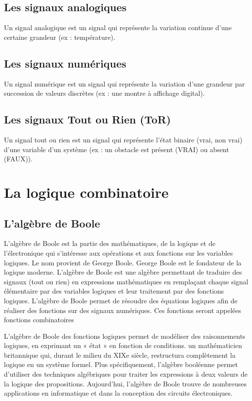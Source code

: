 \documentclass[10pt,fleqn]{article} %
\begin{document}
\subsection{Les signaux analogiques}
\begin{definition}
  Un signal analogique est un signal qui représente la variation continue d’une certaine grandeur (ex : température).
\end{definition}


\subsection{Les signaux numériques}
\begin{definition}
  Un signal numérique est un signal qui
représente la variation d’une grandeur par
succession de valeurs discrètes (ex : une
montre à affichage digital).
\end{definition}


\subsection{Les signaux Tout ou Rien (ToR)}
\begin{definition}
  Un signal tout ou rien est un signal qui représente l’état binaire (vrai, non
vrai) d’une variable d’un système (ex : un obstacle est présent (VRAI) ou absent (FAUX)).
\end{definition}


\section{La logique combinatoire}
\subsection{L'algèbre de Boole}
L'algèbre de Boole est la partie des mathématiques, de la logique et de l'électronique qui s'intéresse aux opérations et aux
fonctions sur les variables logiques. Le nom provient de
George Boole.
George Boole est le fondateur de la logique moderne.
L'algèbre de Boole est une algèbre permettant de traduire des signaux (tout ou rien) en expressions mathématiques en remplaçant
chaque signal élémentaire par des variables logiques et leur traitement par des fonctions logiques. L'algèbre de Boole permet de
résoudre des équations logiques afin de réaliser des fonctions sur des signaux numériques. Ces fonctions seront appelées fonctions
combinatoires

L'algèbre de Boole des fonctions logiques permet de modéliser des raisonnements logiques, en exprimant un « état » en fonction de conditions. un mathématicien britannique qui, durant le milieu du XIXe siècle, restructura complètement la
logique en un système formel. Plus spécifiquement, l'algèbre booléenne permet d'utiliser des techniques algébriques pour traiter les
expressions à deux valeurs de la
logique des propositions.
Aujourd'hui, l'algèbre de Boole trouve de nombreuses applications en informatique et dans la conception des circuits
électroniques.
\end{document}
